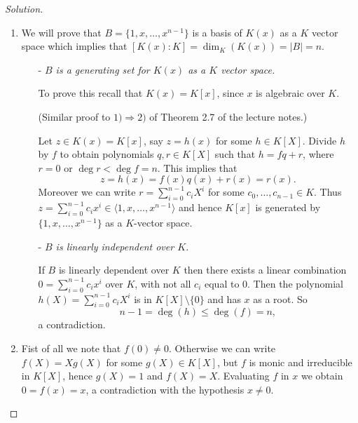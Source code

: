 \documentclass[a4paper,10pt,reqno]{amsart}
\theoremstyle{definition} %
\newenvironment{sol}
  {\renewcommand\qedsymbol{$\blacksquare$}\begin{proof}[Solution]}
  {\end{proof}}
\begin{document}
\begin{sol}~
    \begin{enumerate}[label=(\roman*)]
    \item We will prove that $B=\{1,x,\dots, x^{n-1}\}$ is a basis of $K(x)$ as a $K$ vector space which implies that $[K(x):K]=\dim_K(K(x))=|B|=n$.
    \begin{itemize}
        \item[-] \textit{$B$ is a generating set for $K(x)$ as a $K$ vector space.}
        
        To prove this recall that $K(x)=K[x]$, since $x$ is algebraic over $K$.
        
        (Similar proof to $1)\Rightarrow 2)$ of Theorem 2.7 of the lecture notes.)

        Let $z\in K(x)=K[x]$, say $z=h(x)$ for some $h\in K[X]$. 
        Divide $h$ by $f$ to obtain polynomials $q,r\in K[X]$ 
        such that $h=fq+r$, where $r=0$ or $\deg r<\deg f=n$. This implies that
	\[
		z=h(x)=f(x)q(x)+r(x)=r(x).
	\]
	Moreover we can write
        $r=\sum_{i=0}^{n-1}c_iX^i$ for some $c_0,\dots,c_{n-1}\in K$. 
        Thus $z=\sum_{i=0}^{n-1}c_ix^i\in \langle 1,x,\dots,x^{n-1}\rangle$
        and hence $K[x]$ is generated by $\{1,x,\dots,x^{n-1}\}$ as a $K$-vector space.
        \item[-] \textit{$B$ is linearly independent over $K$.}

        If $B$ is linearly dependent over $K$ then there exists a linear combination 
        $0=\sum_{i=0}^{n-1}c_ix^i$ over $K$, with not all $c_i$ equal to 0.
        Then the polynomial $h(X)=\sum_{i=0}^{n-1}c_iX^i$ is in $K[X]\setminus\{0\}$
        and has $x$ as a root.
        So 
        \[
        n-1=\deg(h)\leq \deg(f)=n,
        \]
     a contradiction.    
    \end{itemize}
    \item Fist of all we note that $f(0)\neq 0$. Otherwise we can write $f(X)=Xg(X)$ for some $g(X)\in K[X]$, but $f$ is monic and irreducible in $K[X]$, hence $g(X)=1$ and $f(X)=X$.
    Evaluating $f$ in $x$ we obtain $0=f(x)=x$, a contradiction with the hypothesis $x\neq 0$.


\end{enumerate}
\end{sol}
\end{document}
